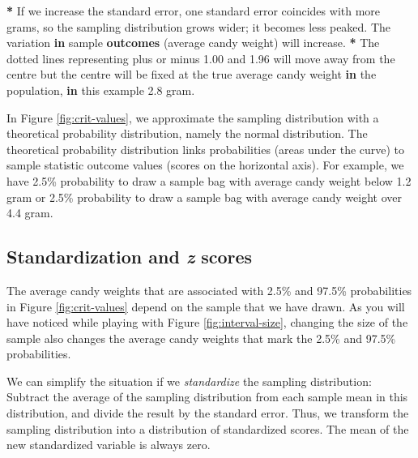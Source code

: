 \documentclass[a4paper]{book}
\newenvironment{Shaded}{\begin{snugshade}}{\end{snugshade}}
\newcommand{\KeywordTok}[1]{\textcolor[rgb]{0,0,0}{\textbf{#1}}}
\newcommand{\FloatTok}[1]{\textcolor[rgb]{0.00,0.00,0.00}{#1}}
\newcommand{\StringTok}[1]{\textcolor[rgb]{0.00,0.00,0.00}{#1}}
\newcommand{\ControlFlowTok}[1]{\textcolor[rgb]{0.00,0.00,0.00}{\textbf{#1}}}
\newcommand{\OperatorTok}[1]{\textcolor[rgb]{0.00,0.00,0.00}{\textbf{#1}}}
\newcommand{\NormalTok}[1]{#1}
\theoremstyle{definition}
\theoremstyle{definition}
\theoremstyle{definition}
\theoremstyle{remark}
\begin{document}
\begin{Shaded}
\begin{Highlighting}[]
\OperatorTok{*}\StringTok{ }\NormalTok{If we increase the standard error, one standard error coincides with more}
\NormalTok{grams, so the sampling distribution grows wider; it becomes less peaked. The}
\NormalTok{variation }\ControlFlowTok{in}\NormalTok{ sample }\KeywordTok{outcomes}\NormalTok{ (average candy weight) will increase.}
\OperatorTok{*}\StringTok{ }\NormalTok{The dotted lines representing plus or minus }\FloatTok{1.00}\NormalTok{ and }\FloatTok{1.96}\NormalTok{ will move away}
\NormalTok{from the centre but the centre will be fixed at the true average candy weight}
\ControlFlowTok{in}\NormalTok{ the population, }\ControlFlowTok{in}\NormalTok{ this example }\FloatTok{2.8}\NormalTok{ gram.}
\end{Highlighting}
\end{Shaded}

In Figure \ref{fig:crit-values}, we approximate the sampling
distribution with a theoretical probability distribution, namely the
normal distribution. The theoretical probability distribution links
probabilities (areas under the curve) to sample statistic outcome values
(scores on the horizontal axis). For example, we have 2.5\% probability
to draw a sample bag with average candy weight below 1.2 gram or 2.5\%
probability to draw a sample bag with average candy weight over 4.4
gram.

\subsection{\texorpdfstring{Standardization and \emph{z}
scores}{Standardization and z scores}}\label{standardization-and-z-scores}

The average candy weights that are associated with 2.5\% and 97.5\%
probabilities in Figure \ref{fig:crit-values} depend on the sample that
we have drawn. As you will have noticed while playing with Figure
\ref{fig:interval-size}, changing the size of the sample also changes
the average candy weights that mark the 2.5\% and 97.5\% probabilities.

We can simplify the situation if we \emph{standardize} the sampling
distribution: Subtract the average of the sampling distribution from
each sample mean in this distribution, and divide the result by the
standard error. Thus, we transform the sampling distribution into a
distribution of standardized scores. The mean of the new standardized
variable is always zero.
\end{document}
